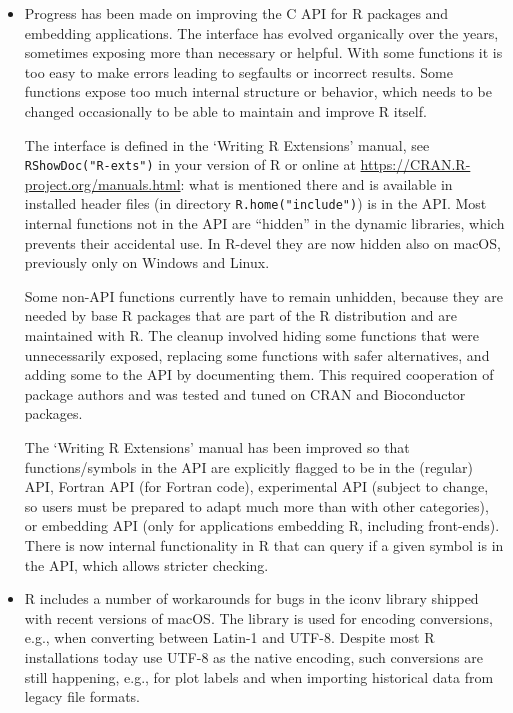 \begin{itemize}
\item
  Progress has been made on improving the C API for R packages and embedding
  applications. The interface has evolved organically over the years,
  sometimes exposing more than necessary or helpful. With some functions it
  is too easy to make errors leading to segfaults or incorrect results.
  Some functions expose too much internal structure or behavior, which needs
  to be changed occasionally to be able to maintain and improve R itself.

  The interface is defined in the `Writing R Extensions' manual,
  see \texttt{RShowDoc("R-exts")} in your version of R or online at
  \url{https://CRAN.R-project.org/manuals.html}: what is mentioned
  there and is available in installed header files (in directory \texttt{R.home("include")}) is
  in the API. Most internal functions not in the API are ``hidden'' in the
  dynamic libraries, which prevents their accidental use. In R-devel they
  are now hidden also on macOS, previously only on Windows and Linux.

  Some non-API functions currently have to remain unhidden, because they are
  needed by base R packages that are part of the R distribution and are
  maintained with R. The cleanup involved hiding some functions that were
  unnecessarily exposed, replacing some functions with
  safer alternatives, and adding some to the API by documenting them. This
  required cooperation of package authors and was tested and tuned on CRAN
  and Bioconductor packages.

  The `Writing R Extensions' manual has been improved so that
  functions/symbols in the API are explicitly flagged to be in the (regular)
  API, Fortran API (for Fortran code), experimental API (subject to change,
  so users must be prepared to adapt much more than with other categories),
  or embedding API (only for applications embedding R, including front-ends).
  There is now internal functionality in R that can query if a given symbol
  is in the API, which allows stricter checking.
\item
  R includes a number of workarounds for bugs in the iconv library shipped with
  recent versions of macOS. The library is used for encoding conversions,
  e.g., when converting between Latin-1 and UTF-8. Despite most R
  installations today use UTF-8 as the native encoding, such conversions are
  still happening, e.g., for plot labels and when importing historical data
  from legacy file formats.


\end{itemize}
